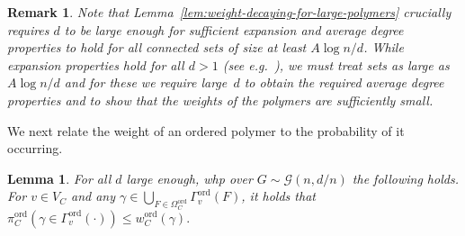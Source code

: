 \documentclass[11pt]{article}
\theoremstyle{plain}
\newtheorem{lemma}[theorem]{Lemma}
\newtheorem{remark}[theorem]{Remark}
\newcommand{\G}{\mathcal{G}}
\newcommand{\1}{\mathbb{1}}
\newcommand{\ord}{\mathrm{ord}}
\begin{document}
\begin{remark}\label{rem:d}
Note that Lemma~\ref{lem:weight-decaying-for-large-polymers} crucially requires \(d\) to be large enough for sufficient expansion and average degree properties to hold for all connected sets of size at least  \( A\log n / d\). While expansion properties hold for all \(d > 1\) (see e.g.~\cite{fountoulakis2007evolution}), we
must treat sets as large as $A \log n/d$
and for these we require large~$d$ to obtain the required 
average degree properties and to show that the weights of the polymers are sufficiently small.
\end{remark}

We next relate the weight of an ordered polymer to the probability of it occurring.
\begin{lemma}\label{lem:bbbb}
    For all \(d\) large enough, whp over \(G\sim\G(n,d/n)\) the following holds. For \(v\in V_C\) and any \(\gamma\in\bigcup_{F\in\Omega_C^\ord}\Gamma^\ord_v(F)\), it holds that $\pi^\ord_C(\gamma\in\Gamma_v^\ord(\cdot))\leq w^\ord_C(\gamma).$
\end{lemma}
\end{document}
